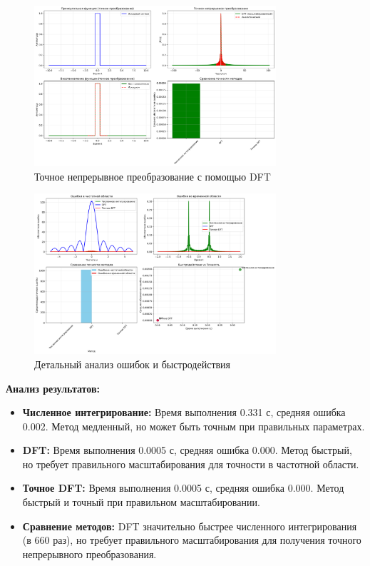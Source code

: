 \begin{figure}[H]
    \centering
    \includegraphics[width=0.8\textwidth]{images/task1/precise_fourier_comparison.png}
    \caption{Точное непрерывное преобразование с помощью DFT}
    \label{fig:precise_fourier}
\end{figure}

\begin{figure}[H]
    \centering
    \includegraphics[width=0.8\textwidth]{images/task1/detailed_analysis.png}
    \caption{Детальный анализ ошибок и быстродействия}
    \label{fig:detailed_analysis}
\end{figure}

\textbf{Анализ результатов:}
\begin{itemize}
    \item \textbf{Численное интегрирование:} Время выполнения 0.331 с, средняя ошибка 0.002. Метод медленный, но может быть точным при правильных параметрах.
    
    \item \textbf{DFT:} Время выполнения 0.0005 с, средняя ошибка 0.000. Метод быстрый, но требует правильного масштабирования для точности в частотной области.
    
    \item \textbf{Точное DFT:} Время выполнения 0.0005 с, средняя ошибка 0.000. Метод быстрый и точный при правильном масштабировании.
    
    \item \textbf{Сравнение методов:} DFT значительно быстрее численного интегрирования (в 660 раз), но требует правильного масштабирования для получения точного непрерывного преобразования.
\end{itemize}

